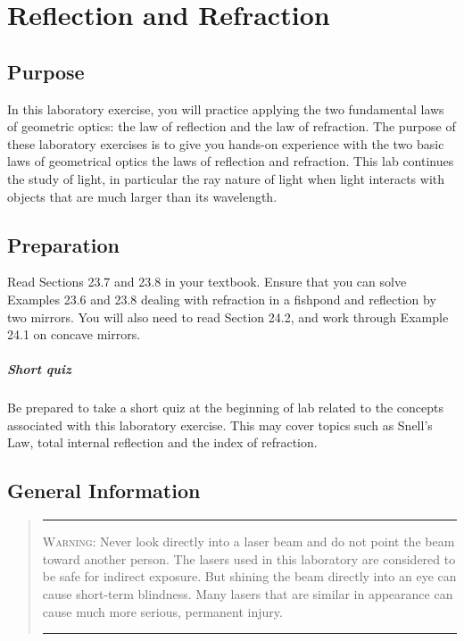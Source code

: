 \chapter{Reflection and Refraction}

\section{Purpose}
	In this laboratory exercise, you will practice applying the two fundamental laws of geometric optics: the law of reflection and the law of refraction.
  The purpose of these laboratory exercises is to give you hands-on experience with the two basic laws of geometrical optics the laws of reflection and refraction. This lab continues the study of light, in particular the ray nature of light when light interacts with objects that are much larger than its wavelength.
  
\section{Preparation}
Read Sections 23.7 and 23.8 in your textbook.  Ensure that you can solve Examples 23.6 and 23.8 dealing with refraction in a fishpond and reflection by two mirrors.  You will also need to read Section 24.2, and work through Example 24.1 on concave mirrors.

\paragraph{Short quiz}
  Be prepared to take a short quiz at the beginning of lab related to the concepts associated with this laboratory exercise.  This may cover topics such as Snell's Law, total internal reflection and the index of refraction.
\section{General Information}

\begin{quote}
\hrule
\textsc{Warning:}  Never look directly into a laser beam and do not point the beam toward another person.  The lasers used in this laboratory are considered to be safe for indirect exposure.  But shining the beam directly into an eye can cause short-term blindness.  Many lasers that are similar in appearance can cause much more serious, permanent injury.\\[-0.5em]

\hrule
\end{quote}
  
